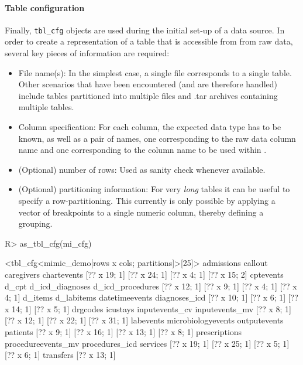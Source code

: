 \documentclass[
  notitle]{jss}
\begin{document}
\hypertarget{table-configuration}{%
\paragraph{Table configuration}\label{table-configuration}}

Finally, \texttt{tbl\_cfg} objects are used during the initial set-up of
a data source. In order to create a representation of a table that is
accessible from  from raw data, several key pieces of
information are required:

\begin{itemize}
\item
  File name(s): In the simplest case, a single file corresponds to a
  single table. Other scenarios that have been encountered (and are
  therefore handled) include tables partitioned into multiple files and
  .tar archives containing multiple tables.
\item
  Column specification: For each column, the expected data type has to
  be known, as well as a pair of names, one corresponding to the raw
  data column name and one corresponding to the column name to be used
  within .
\item
  (Optional) number of rows: Used as sanity check whenever available.
\item
  (Optional) partitioning information: For very \emph{long} tables it
  can be useful to specify a row-partitioning. This currently is only
  possible by applying a vector of breakpoints to a single numeric
  column, thereby defining a grouping.
\end{itemize}

\begin{CodeChunk}
\begin{CodeInput}
R> as_tbl_cfg(mi_cfg)
\end{CodeInput}
\begin{CodeOutput}
<tbl_cfg<mimic_demo[rows x cols; partitions]>[25]>
        admissions            callout         caregivers        chartevents 
      [?? x 19; 1]       [?? x 24; 1]        [?? x 4; 1]       [?? x 15; 2] 
         cptevents              d_cpt    d_icd_diagnoses   d_icd_procedures 
      [?? x 12; 1]        [?? x 9; 1]        [?? x 4; 1]        [?? x 4; 1] 
           d_items         d_labitems     datetimeevents      diagnoses_icd 
      [?? x 10; 1]        [?? x 6; 1]       [?? x 14; 1]        [?? x 5; 1] 
          drgcodes           icustays     inputevents_cv     inputevents_mv 
       [?? x 8; 1]       [?? x 12; 1]       [?? x 22; 1]       [?? x 31; 1] 
         labevents microbiologyevents       outputevents           patients 
       [?? x 9; 1]       [?? x 16; 1]       [?? x 13; 1]        [?? x 8; 1] 
     prescriptions procedureevents_mv     procedures_icd           services 
      [?? x 19; 1]       [?? x 25; 1]        [?? x 5; 1]        [?? x 6; 1] 
         transfers 
      [?? x 13; 1] 
\end{CodeOutput}
\end{CodeChunk}
\end{document}
